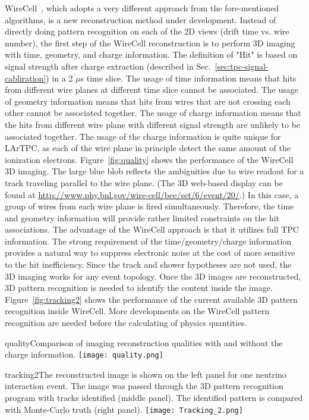 WireCell~\cite{wire-cell}, which adopts a very different approach from the 
fore-mentioned algorithms, is a new reconstruction method under development.
Instead of directly doing pattern recognition on each of the 2D views (drift 
time vs. wire number), the first step of the WireCell reconstruction is to 
perform 3D imaging with time, geometry, and charge information. The definition
of "Hit" is based on signal strength after charge extraction (described in 
Sec.~\ref{sec:tpc-signal-cabliration}) in a 2 $\mu$s time slice. The usage of 
time information means that hits from different wire planes at different time 
slice cannot be associated. The usage of geometry information means that hits
from wires that are not crossing each other cannot be associated together. 
The usage of charge information means that the hits from different wire plane
with different signal strength are unlikely to be associated together. The 
usage of the charge information is quite unique for LArTPC, as each of the 
wire plane in principle detect the same amount of the ionization electrons. 
Figure~\ref{fig:quality} shows the performance of the WireCell 3D imaging. 
The large blue blob reflects the ambiguities due to wire readout for a track
traveling parallel to the wire plane. (The 3D web-based 
display can be found at 
\url{http://www.phy.bnl.gov/wire-cell/bee/set/6/event/20/}.) In this case, a group of wires from each 
wire plane is fired simultaneously. Therefore, the time and geometry 
information will provide rather limited constraints on the hit associations. 
The advantage of the WireCell approach is that it utilizes full TPC 
information. The strong requirement of the time/geometry/charge information
provides a natural way to suppress electronic noise at the cost of more
sensitive to the hit inefficiency. Since the track and shower hypotheses
are not used, the 3D imaging works for any event topology. Once the 3D
images are reconstructed, 3D pattern recognition is needed to identify 
the content inside the image. Figure~\ref{fig:tracking2} shows the 
performance of the current available 3D pattern recognition inside
WireCell. More developments on the WireCell pattern recognition 
are needed before the calculating of physics quantities. 


\begin{cdrfigure}{quality}{Comparison of imaging reconstruction 
qualities with and without the charge information. }
\texttt{[image: quality.png]}
\end{cdrfigure}


\begin{cdrfigure}{tracking2}{The reconstructed image is shown 
on the left panel for one neutrino interaction event. The image 
was passed through the 3D pattern recognition program with tracks 
identified (middle panel). The identified pattern is compared 
with Monte-Carlo truth (right panel).}
 \texttt{[image: Tracking\_2.png]}
\end{cdrfigure}
